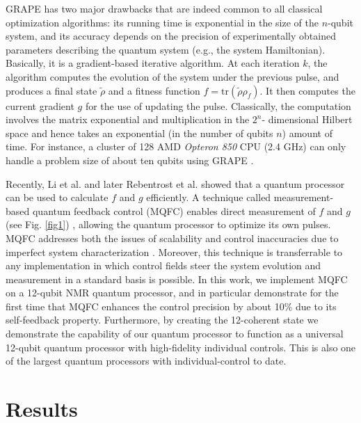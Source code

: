 \documentclass[twocolumn,reprint, amsmath,amssymb,showpacs,superscriptaddress]{revtex4-1}
\newcommand{\tr}{\textrm{tr}}
\begin{document}
GRAPE has two major drawbacks that are indeed common to all classical optimization algorithms: its running time is exponential in the size of the $n$-qubit system, and its accuracy depends on the precision of experimentally obtained  parameters describing the quantum system (e.g., the system Hamiltonian). Basically, it is a gradient-based iterative algorithm. At each iteration $k$, the algorithm computes the evolution of the system under the previous pulse, and produces a final state $\tilde{\rho}$ and a fitness function $f=\tr(\tilde{\rho}\rho_f)$. It then computes the current gradient $g$ for the use of updating the pulse. Classically, the computation involves the matrix exponential and multiplication in the  %
$2^n$-
dimensional  Hilbert space and hence takes an exponential (in the number of qubits $n$) amount of time. For instance, a cluster of 128 AMD \emph{Opteron 850} CPU (2.4 GHz) can only handle a problem size of about ten qubits using GRAPE \cite{gradl2006parallelising}.

Recently, Li et al. \cite{li2016physical} and later Rebentrost et al.  \cite{rebentrost2016quantum}   showed that a quantum processor can be used to   calculate $f$ and $g$ efficiently.   A technique called  measurement-based quantum feedback control (MQFC)  enables direct measurement of $f$ and $g$ (see  Fig. \ref{fig1})%
, allowing the quantum processor to optimize its own pulses. MQFC addresses both the issues of scalability and control inaccuracies due to imperfect system characterization \cite{vijay2012stabilizing,hirose2016coherent}. Moreover, this technique is transferrable to any implementation in which control fields steer the system evolution and measurement in a standard basis is possible. In this work, we implement MQFC on a 12-qubit NMR quantum processor, and in particular demonstrate for the first time that MQFC  enhances the control precision by about 10\% due to its self-feedback property. Furthermore, by creating  the 12-coherent state  %
we demonstrate the  capability of our quantum processor to  function  as a universal 12-qubit quantum processor with high-fidelity individual controls. This is also one of the largest quantum processors with individual-control to date.


\section{Results}
\end{document}
